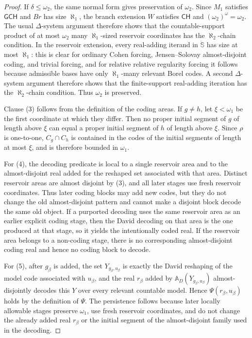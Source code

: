 \documentclass[a4paper,11pt]{article}
\newcommand{\CH}{\mathsf{CH}}
\newcommand{\GCH}{\mathsf{GCH}}
\begin{document}
\begin{proof}
If \(\delta\leq\omega_2\), the same normal form gives preservation of
\(\omega_2\).  Since \(M_1\) satisfies \(\GCH\) and \(Br\) has size \(\aleph_1\), the branch
extension \(W\) satisfies \(\CH\) and \( (\omega_2)^\omega=\omega_2\).
The usual \(\Delta\)-system argument therefore shows that the
countable-support product of at most \(\omega_2\) many \(\aleph_1\)-sized
reservoir coordinates has the \(\aleph_2\)-chain condition.
In the reservoir extension, every real-adding iterand in \(\dot{\mathbb S}\) has
size at most \(\aleph_1\): this is clear for ordinary Cohen forcing,
Jensen--Solovay almost-disjoint coding, and trivial forcing, and for relative
relative regularity forcing it follows because admissible bases have only
\(\aleph_1\)-many relevant Borel codes.  A second \(\Delta\)-system argument
therefore shows that the finite-support real-adding iteration has the
\(\aleph_2\)-chain condition.  Thus \(\omega_2\) is preserved.

Clause (3) follows from the definition of the coding areas.  If \(g\ne h\), let
\(\xi<\omega_1\) be the first coordinate at which they differ.  Then no proper
initial segment of \(g\) of length above \(\xi\) can equal a proper initial
segment of \(h\) of length above \(\xi\).  Since \(\rho\) is one-to-one,
\(C_g\cap C_h\) is contained in the codes of the initial segments of length at
most \(\xi\), and is therefore bounded in \(\omega_1\).

For (4), the decoding predicate is local to a single reservoir area and to the
almost-disjoint real added for the reshaped set associated with that area.
Distinct reservoir areas are almost disjoint by (3), and all later stages use
fresh reservoir coordinates.  Thus later coding blocks may add new codes, but
they do not change the old almost-disjoint pattern and cannot make a disjoint
block decode the same old object.  If a purported decoding uses the same
reservoir area as an earlier explicit coding stage, then the David decoding on
that area is the one produced at that stage, so it yields the intentionally
coded real.  If the reservoir area belongs to a non-coding stage, there is no
corresponding almost-disjoint coding real and hence no coding block to decode.

For (5), after \(g_\beta\) is added, the set \(Y_{g_\beta,u_\beta}\) is exactly
the David reshaping of the model code associated with \(u_\beta\), and the real
\(r_\beta\) added by \(\mathbb A_D(Y_{g_\beta,u_\beta})\) almost-disjointly
decodes this \(Y\) over every relevant countable model.  Hence
\(\Psi(r_\beta,u_\beta)\) holds by the definition of \(\Psi\).  The persistence
follows because later locally allowable stages preserve \(\omega_1\), use fresh
reservoir coordinates, and do not change the already added real \(r_\beta\) or
the initial segment of the almost-disjoint family used in the decoding.
\end{proof}
\end{document}
